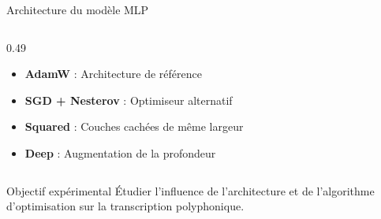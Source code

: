 \begin{frame}{Architecture du modèle MLP}
\begin{columns}[T,onlytextwidth]
\begin{column}{0.49\textwidth}
			\begin{itemize}
				\item \textbf{AdamW} : Architecture de référence
				\item \textbf{SGD + Nesterov} : Optimiseur alternatif
				\item \textbf{Squared} : Couches cachées de même largeur
				\item \textbf{Deep} : Augmentation de la profondeur
			\end{itemize}
		\end{column}
	\end{columns}
	
	\vspace{0.2cm}
	
	\begin{block}{Objectif expérimental}
		Étudier l'influence de l'architecture et de l'algorithme d'optimisation sur la transcription polyphonique.
	\end{block}
\end{frame}


